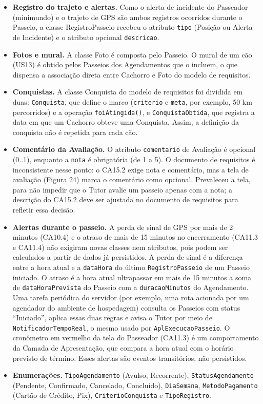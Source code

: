 \begin{itemize}
	\item \textbf{Registro do trajeto e alertas.} Como o alerta de incidente do Passeador (minimundo) e o trajeto de GPS são ambos registros ocorridos durante o Passeio, a classe RegistroPasseio recebeu o atributo \texttt{tipo} (Posição ou Alerta de Incidente) e o atributo opcional \texttt{descricao}.

	\item \textbf{Fotos e mural.} A classe Foto é composta pelo Passeio. O mural de um cão (US13) é obtido pelos Passeios dos Agendamentos que o incluem, o que dispensa a associação direta entre Cachorro e Foto do modelo de requisitos.

	\item \textbf{Conquistas.} A classe Conquista do modelo de requisitos foi dividida em duas: \texttt{Conquista}, que define o marco (\texttt{criterio} e \texttt{meta}, por exemplo, 50 km percorridos) e a operação \texttt{foiAtingida()}, e \texttt{ConquistaObtida}, que registra a data em que um Cachorro obteve uma Conquista. Assim, a definição da conquista não é repetida para cada cão.

	\item \textbf{Comentário da Avaliação.} O atributo \texttt{comentario} de Avaliação é opcional (0..1), enquanto a \texttt{nota} é obrigatória (de 1 a 5). O documento de requisitos é inconsistente nesse ponto: o CA15.2 exige nota e comentário, mas a tela de avaliação (Figura 24) marca o comentário como opcional. Prevaleceu a tela, para não impedir que o Tutor avalie um passeio apenas com a nota; a descrição do CA15.2 deve ser ajustada no documento de requisitos para refletir essa decisão.

	\item \textbf{Alertas durante o passeio.} A perda de sinal de GPS por mais de 2 minutos (CA10.4) e o atraso de mais de 15 minutos no encerramento (CA11.3 e CA11.4) não exigiram novas classes nem atributos, pois podem ser calculados a partir de dados já persistidos. A perda de sinal é a diferença entre a hora atual e a \texttt{dataHora} do último \texttt{RegistroPasseio} de um Passeio iniciado. O atraso é a hora atual ultrapassar em mais de 15 minutos a soma de \texttt{dataHoraPrevista} do Passeio com a \texttt{duracaoMinutos} do Agendamento. Uma tarefa periódica do servidor (por exemplo, uma rota acionada por um agendador do ambiente de hospedagem) consulta os Passeios com status ``Iniciado'', aplica essas duas regras e avisa o Tutor por meio de \texttt{NotificadorTempoReal}, o mesmo usado por \texttt{AplExecucaoPasseio}. O cronômetro em vermelho da tela do Passeador (CA11.3) é um comportamento da Camada de Apresentação, que compara a hora atual com o horário previsto de término. Esses alertas são eventos transitórios, não persistidos.

	\item \textbf{Enumerações.} \texttt{TipoAgendamento} (Avulso, Recorrente), \texttt{StatusAgendamento} (Pendente, Confirmado, Cancelado, Concluído), \texttt{DiaSemana}, \texttt{MetodoPagamento} (Cartão de Crédito, Pix), \texttt{CriterioConquista} e \texttt{TipoRegistro}.
\end{itemize}

